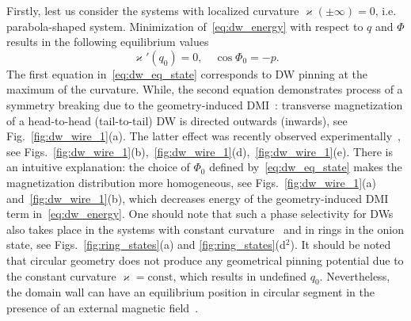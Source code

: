 \documentclass[runningheads]{llncs}
\begin{document}
Firstly, lest us consider the systems with localized curvature $\varkappa(\pm\infty)=0$, i.e. parabola-shaped system. Minimization of~\eqref{eq:dw_energy} with respect to $q$ and $\Phi$ results in the following equilibrium values
\begin{equation}\label{eq:dw_eq_state}
\varkappa'\left(q_0\right)=0,\quad\cos\Phi_0=-p.
\end{equation}
The first equation in~\eqref{eq:dw_eq_state} corresponds to DW pinning at the maximum of the curvature. While, the second equation demonstrates process of a symmetry breaking due to the geometry-induced DMI~\cite{Yershov15b}: transverse magnetization of a head-to-head (tail-to-tail) DW is directed outwards (inwards), see Fig.~\ref{fig:dw_wire_1}(a). The latter effect was recently observed experimentally~\cite{Kim14,Volkov19c}, see Figs.~\ref{fig:dw_wire_1}(b),~\ref{fig:dw_wire_1}(d),~\ref{fig:dw_wire_1}(e). There is an intuitive explanation: the choice of $\Phi_0$ defined by~\eqref{eq:dw_eq_state} makes the magnetization distribution more homogeneous, see Figs.~\ref{fig:dw_wire_1}(a) and~\ref{fig:dw_wire_1}(b), which decreases energy of the geometry-induced DMI term in~\eqref{eq:dw_energy}. One should note that such a phase selectivity for DWs also takes place in the systems with constant curvature~\cite{Moreno17a} and in rings in the onion state, see Figs.~\ref{fig:ring_states}(a) and \ref{fig:ring_states}(d$^2$). It should be noted that circular geometry does not produce any geometrical pinning potential due to the constant curvature $\varkappa=\text{const}$, which results in undefined $q_0$. Nevertheless, the domain wall can have an equilibrium position in circular segment in the presence of an external magnetic field~\cite{Kruger07a,Jamali11}.
\end{document}
